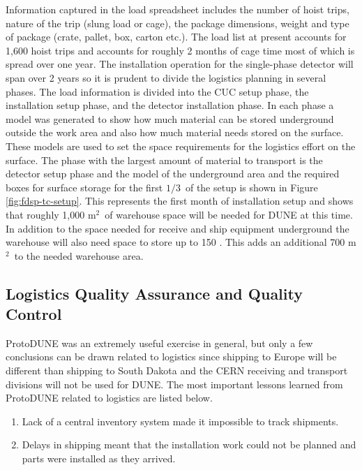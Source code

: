 Information captured in the load spreadsheet includes the number of hoist trips, nature of the trip (slung load or cage), the package dimensions, weight and type of package (crate, pallet, box, carton etc.). The load list at present accounts for 1,600 hoist trips and accounts for roughly 2 months of cage time most of which is spread over one year. The installation operation for the single-phase detector will span over 2 years so it is prudent to divide the logistics planning in several phases. The load information is divided into the CUC setup phase, the installation setup phase, and the detector installation phase. In each phase a model was generated to show how much material can be stored underground outside the work area and also how much material needs stored on the surface. These models are used to set the space requirements for the logistics effort on the surface. The phase with the largest amount of material to transport is the detector setup phase and the model of the underground area and the required boxes for surface storage for the first $1/3$\ of the setup is shown in Figure \ref{fig:fdsp-tc-setup}. This represents the first month of installation setup and shows that roughly 1,000 m$^2$\ of warehouse space will be needed for DUNE at this time. In addition to the space needed for receive and ship equipment underground the warehouse will also need space to store up to 150 . This adds an additional 700 m$^2$\ to the needed warehouse area. 


\subsection{Logistics Quality Assurance and Quality Control}
\label{sec:fdsp-tc-log-qaqc}


ProtoDUNE was an extremely useful exercise in general, but only a few conclusions can be drawn related to logistics since shipping to Europe will be different than shipping to South Dakota and the CERN receiving and transport divisions will not be used for DUNE. The most important lessons learned from ProtoDUNE related to logistics are listed below.
\begin{enumerate}
\item Lack of a central inventory system made it impossible to track shipments.
\item Delays in shipping meant that the installation work could not be planned and parts were installed as they arrived. 
\end{enumerate}

